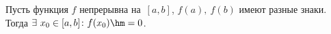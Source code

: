 
Пусть функция $f$ непрерывна на~$[a,b]$, $f(a),\ f(b)$ имеют разные знаки. Тогда $\exists\  x_0\in[a,b]\colon
f(x_0)\hm=0$.
